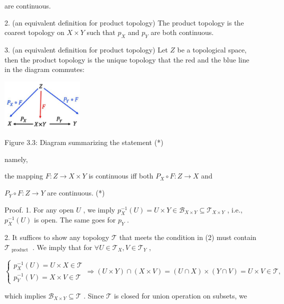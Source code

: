 are continuous.

2. (an equivalent definition for product topology) The product topology is the coarest topology on \(X \times  Y\) such that \({p}_{X}\) and \({p}_{Y}\) are both continuous.

3. (an equivalent definition for product topology) Let \(Z\) be a topological space, then the product topology is the unique topology that the red and the blue line in the diagram commutes:

\begin{center}
\includegraphics[max width=0.3\textwidth]{images/bo_d2bcsrref24c73avs720_42_640_1003_383_238_0.jpg}
\end{center}
\hspace*{3em} 

Figure 3.3: Diagram summarizing the statement (*)

namely,

the mapping \(F : Z \rightarrow  X \times  Y\) is continuous iff both \({P}_{X} \circ  F : Z \rightarrow  X\) and

\({P}_{Y} \circ  F : Z \rightarrow  Y\) are continuous. (*)

Proof. 1. For any open \(U\) , we imply \({p}_{X}^{-1}\left( U\right)  = U \times  Y \in  {\mathcal{B}}_{X \times  Y} \subseteq  {\mathcal{T}}_{X \times  Y}\) , i.e., \({p}_{X}^{-1}\left( U\right)\) is open. The same goes for \({p}_{Y}\) .

2. It suffices to show any topology \(\mathcal{T}\) that meets the condition in (2) must contain \({\mathcal{T}}_{\text{ product }}\) . We imply that for \(\forall U \in  {\mathcal{T}}_{X},V \in  {\mathcal{T}}_{Y}\) ,

\[
\left\{  {\begin{array}{l} {p}_{X}^{-1}\left( U\right)  = U \times  X \in  \mathcal{T} \\  {p}_{Y}^{-1}\left( V\right)  = X \times  V \in  \mathcal{T} \end{array} \Rightarrow  \left( {U \times  Y}\right)  \cap  \left( {X \times  V}\right)  = \left( {U \cap  X}\right)  \times  \left( {Y \cap  V}\right)  = U \times  V \in  \mathcal{T},}\right.
\]

which implies \({\mathcal{B}}_{X \times  Y} \subseteq  \mathcal{T}\) . Since \(\mathcal{T}\) is closed for union operation on subsets, we

